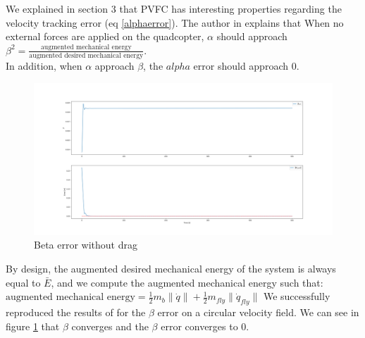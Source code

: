 We explained in section 3 that PVFC has interesting properties regarding the velocity tracking error (eq \ref{alphaerror}). 
The author in \cite{li1999passive} explains that When no external forces are applied on the quadcopter, $\alpha$ should approach $\beta^2 = \frac{\text{augmented mechanical energy}}{\text{augmented desired mechanical energy}}$.\\
In addition, when $\alpha$ approach $\beta$, the $alpha$ error should approach 0.

\begin{figure}[h!]
   \centering
   \includegraphics[width=\linewidth, scale=1.5]{Images/betaerrornodrag.png}
   \caption{Beta error without drag}
   \label{fig:betaerrornodrag}
\end{figure}
By design, the augmented desired mechanical energy of the system is always equal to $\bar{E}$, and we compute the augmented mechanical energy such that:\\ $\text{augmented mechanical energy} = \frac{1}{2}m_b\lVert\dot{q}\rVert + \frac{1}{2}m_{fly}\lVert\dot{q}_{fly}\rVert $
We successfully reproduced the results of \cite{li1999passive} for the $\beta$ error on a circular velocity field. We can see in figure \ref{fig:betaerrornodrag} that $\beta$ converges and the $\beta$ error converges to 0.

